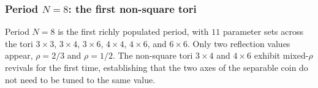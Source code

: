 \subsubsection{Period $N = 8$: the first non-square tori}

Period $N = 8$ is the first richly populated period, with $11$
parameter sets across the tori $3 \times 3$, $3 \times 4$, $3 \times 6$,
$4 \times 4$, $4 \times 6$, and $6 \times 6$. Only two reflection
values appear, $\rho = 2/3$ and $\rho = 1/2$. The non-square tori
$3 \times 4$ and $4 \times 6$ exhibit mixed-$\rho$ revivals for the
first time, establishing that the two axes of the separable coin do
not need to be tuned to the same value.
